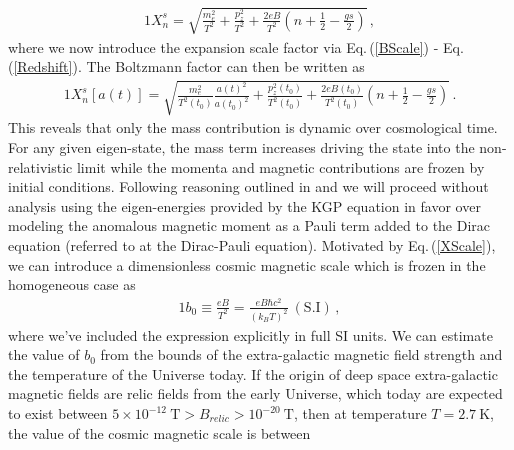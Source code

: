 \documentclass[universe,article,submit,moreauthors,pdftex,a4paper]{Definitions/mdpi}
\newcommand{\req}[1]{Eq.\,(\ref{#1})}
\begin{document}
\begin{alignat}{1}
    \label{XExplicit} X_{n}^{s} = \sqrt{\frac{m_{e}^{2}}{T^{2}}+\frac{p_{z}^{2}}{T^{2}}+\frac{2eB}{T^{2}}\left(n+\frac{1}{2}-\frac{gs}{2}\right)}\,,
\end{alignat}
where we now introduce the expansion scale factor via \req{BScale} - \req{Redshift}. The Boltzmann factor can then be written as
\begin{alignat}{1}
    \label{XScale} X_{n}^{s}[a(t)] = \sqrt{\frac{m_{e}^{2}}{T^{2}(t_{0})}\frac{a(t)^{2}}{a(t_{0})^{2}}+\frac{p_{z}^{2}(t_{0})}{T^{2}(t_{0})}+\frac{2eB(t_{0})}{T^{2}(t_{0})}\left(n+\frac{1}{2}-\frac{gs}{2}\right)}\,.
\end{alignat}
This reveals that only the mass contribution is dynamic over cosmological time. For any given eigen-state, the mass term increases driving the state into the non-relativistic limit while the momenta and magnetic contributions are frozen by initial conditions.
Following reasoning outlined in \cite{Rafelski:2022bsv} and \cite{Steinmetz:2018ryf} we will proceed without analysis using the eigen-energies provided by the KGP equation in favor over modeling the anomalous magnetic moment as a Pauli term added to the Dirac equation (referred to at the Dirac-Pauli equation). Motivated by \req{XScale}, we can introduce a dimensionless cosmic magnetic scale which is frozen in the homogeneous case as
\begin{alignat}{1}
    \label{Bo} b_{0}\equiv\frac{eB}{T^{2}}=\frac{eB\hbar c^{2}}{(k_{B}T)^{2}}\ \mathrm{(S.I)}\,,
\end{alignat}
where we've included the expression explicitly in full SI units. We can estimate the value of $b_{0}$ from the bounds of the extra-galactic magnetic field strength and the temperature of the Universe today.  If the origin of deep space extra-galactic magnetic fields are relic fields from the early Universe, which today are expected to exist between $5\times10^{-12}\ \mathrm{T}>B_{relic}>10^{-20}\ \mathrm{T}$, then at temperature $T=2.7\ \mathrm{K}$, the value of the cosmic magnetic scale is between
\end{document}
